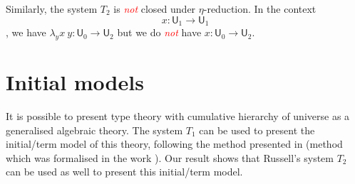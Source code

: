 \documentclass[11pt,a4paper]{article}
\theoremstyle{definition}
\def\UU{\mathsf{U}}
\newcommand{\EMP}[1]{\emph{\textcolor{red}{#1}}}
\begin{document}
\medskip

     Similarly, the system $T_2$ is \EMP{not} closed under $\eta$-reduction. In the context
     $$x:\UU_1\rightarrow\UU_1$$, we have $\lambda_yx~y:\UU_0\rightarrow\UU_2$ but we do \EMP{not} have
     $x:\UU_0\rightarrow\UU_2$.




\section{Initial models}

It is possible to present type theory with cumulative hierarchy of universe as a generalised algebraic theory.
The system $T_1$ can be used to present the initial/term model of this theory, following the method presented in \cite{Streicher:semtt}
(method which was formalised in the work \cite{brunerie:initiality}).
Our result shows that Russell's system $T_2$ can be used as well to present this initial/term model.





\end{document}
